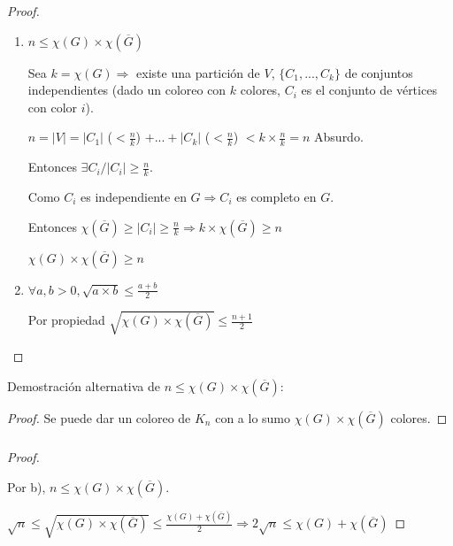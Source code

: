 \subsubsection{}
\begin{proof}
	\begin{enumerate}
		\item {
			$n \leq \chi(G) \times \chi(\overline{G})$

			Sea $k = \chi(G) \Longrightarrow$ existe una partición de $V$, $\{C_1, ..., C_k\}$ de conjuntos independientes (dado un coloreo con $k$ colores, $C_i$ es el conjunto de vértices con color $i$).

			$n = |V| = |C_1|$ ($< \frac{n}{k}$) $ + ... + |C_k|$ ($< \frac{n}{k}$) $< k \times \frac{n}{k} = n$ Absurdo.

			Entonces $\exists C_i / |C_i| \geq \frac{n}{k}$.

			Como $C_i$ es independiente en $G \Longrightarrow C_i$ es completo en $G$.

			Entonces $\chi(\overline{G}) \geq |C_i| \geq \frac{n}{k} \Longrightarrow k \times \chi(\overline{G}) \geq n $

			$\chi(G) \times \chi(\overline{G}) \geq n$
		}
		\item {
			\begin{prop}
			\label{CBC}
				$\forall a, b > 0, \sqrt{a \times b} \leq \frac{a + b}{2}$
			\end{prop}

			Por propiedad $\sqrt{\chi(G) \times \chi(\overline{G})} \leq \frac{n + 1}{2}$
		}
	\end{enumerate}
\end{proof}

Demostración alternativa de $n \leq \chi(G) \times \chi(\overline{G})$:

\begin{proof}
	Se puede dar un coloreo de $K_n$ con a lo sumo $\chi(G) \times \chi(\overline{G})$ colores.
\end{proof}

\subsubsection{}
\begin{proof}

	~

	Por b), $n \leq \chi(G) \times \chi(\overline{G})$.

	$\sqrt{n} \leq \sqrt{\chi(G) \times \chi(\overline{G})} \leq \frac{\chi(G) + \chi(\overline{G})}{2} \Longrightarrow 2 \sqrt{n} \leq \chi(G) + \chi(\overline{G})$
\end{proof}


